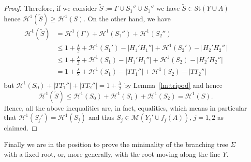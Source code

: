 \documentclass{amsart}
\renewcommand{\H}{\mathcal H}
\newcommand{\abs}[1]{\left\vert #1 \right\vert}
\newcommand{\St}{\mathrm{St}}
\newcommand{\M}{\mathcal{M}}
\renewcommand{\H}{\mathcal{H}}
\theoremstyle{definition}
\theoremstyle{remark}
\begin{document}
\begin{proof}
  Therefore, if we consider $\tilde S := \Gamma \cup S_1''\cup S_1''$ 
  we have $\tilde S\in \St(Y\cup A)$ hence $\H^1(\tilde S)\ge \H^1(S)$.
  On the other hand, we have 
  \begin{align*}
    \H^1(\tilde S) 
    &= \H^1(\Gamma) + \H^1(S_1'') + \H^1(S_2'') \\
    &\le 1 + \frac{\lambda}{2} 
      + \H^1(S_1') - \abs{H_1' H_1''}
      + \H^1(S_2') - \abs{H_2' H_2''} \\
      &\le 1 + \frac \lambda 2 + \H^1(S_1) - \abs{H_1' H_1''} + \H^1(S_2) - \abs{H_2' H_2''}\\
      &= 1  + \frac \lambda 2 + \H^1(S_1) - \abs{T T_1''} + \H^1(S_2) - \abs{T T_2''}\\
    \end{align*}
    but $\H^1(S_0)+\abs{T T_1''}+\abs{T T_2''} = 1+\frac \lambda 2$
    by Lemma~\ref{lm:tripod}
    and hence
    \[
      \H^1(\tilde S) 
      \le \H^1(S_0) + \H^1(S_1) + \H^1(S_2)
      = \H^1(S).
    \]
  Hence, all the above inequalities are, in fact, equalities,
  which means in particular that $\H^1(S_j')=\H^1(S_j)$
  and thus $S_j \in \M(Y_j'\cup f_j(A))$, $j=1,2$ as claimed.
\end{proof}

Finally we are in the position to prove the minimality of 
the branching tree $\Sigma$ with a fixed root, or, more generally,
with the root moving along the line $Y$.
\end{document}
